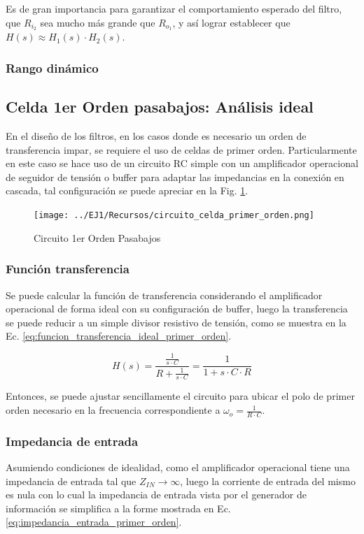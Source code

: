 Es de gran importancia para garantizar el comportamiento esperado del filtro, que $R_{i_2}$ sea mucho m\'as grande que $R_{o_1}$, y as\'i
lograr establecer que $H(s) \approx H_1(s) \cdot H_2(s)$.

\subsubsection{Rango din\'amico}

\subsection{Celda 1er Orden pasabajos: An\'alisis ideal}
En el dise\~no de los filtros, en los casos donde es necesario un orden de transferencia impar, se requiere el uso de celdas de primer orden.
Particularmente en este caso se hace uso de un circuito RC simple con un amplificador operacional de seguidor de tensi\'on o buffer para adaptar las impedancias en la conexi\'on en cascada,
tal configuraci\'on se puede apreciar en la Fig. \ref{fig:circuito_pasabajos_primer_orden}.

\begin{figure}[H]
    \centering
        \texttt{[image: ../EJ1/Recursos/circuito\_celda\_primer\_orden.png]}
    \caption{Circuito 1er Orden Pasabajos}
    \label{fig:circuito_pasabajos_primer_orden}
\end{figure}

\subsubsection{Funci\'on transferencia}
Se puede calcular la funci\'on de transferencia considerando el amplificador operacional de forma ideal con su configuraci\'on de buffer,
luego la transferencia se puede reducir a un simple divisor resistivo de tensi\'on, como se muestra en la Ec. \ref{eq:funcion_transferencia_ideal_primer_orden}.

\begin{equation}
    H(s) = \frac{\frac{1}{s \cdot C}}{R + \frac{1}{s \cdot C}} = \frac{1}{1 + s \cdot C \cdot R}
    \label{eq:funcion_transferencia_ideal_primer_orden}
\end{equation}

Entonces, se puede ajustar sencillamente el circuito para ubicar el polo de primer orden necesario en la frecuencia correspondiente a $\omega_o = \frac{1}{R \cdot C}$.

\subsubsection{Impedancia de entrada}
Asumiendo condiciones de idealidad, como el amplificador operacional tiene una impedancia de entrada tal que $Z_{IN} \rightarrow \infty$, luego la corriente de entrada del mismo es nula
con lo cual la impedancia de entrada vista por el generador de informaci\'on se simplifica a la forme mostrada en Ec. \ref{eq:impedancia_entrada_primer_orden}.

